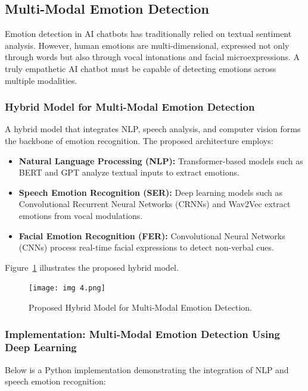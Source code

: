\documentclass[a4paper,10pt]{article}
\begin{document}
\subsection{Multi-Modal Emotion Detection}
Emotion detection in AI chatbots has traditionally relied on textual sentiment analysis. However, human emotions are multi-dimensional, expressed not only through words but also through vocal intonations and facial microexpressions. A truly empathetic AI chatbot must be capable of detecting emotions across multiple modalities.

\subsubsection{Hybrid Model for Multi-Modal Emotion Detection}
A hybrid model that integrates NLP, speech analysis, and computer vision forms the backbone of emotion recognition. The proposed architecture employs:

\begin{itemize}
    \item \textbf{Natural Language Processing (NLP):} Transformer-based models such as BERT and GPT analyze textual inputs to extract emotions.
    \item \textbf{Speech Emotion Recognition (SER):} Deep learning models such as Convolutional Recurrent Neural Networks (CRNNs) and Wav2Vec extract emotions from vocal modulations.
    \item \textbf{Facial Emotion Recognition (FER):} Convolutional Neural Networks (CNNs) process real-time facial expressions to detect non-verbal cues.
\end{itemize}

Figure~\ref{fig:multi_modal_architecture} illustrates the proposed hybrid model.

\begin{figure}[h]
    \centering
    \texttt{[image: img 4.png]}
    \caption{Proposed Hybrid Model for Multi-Modal Emotion Detection.}
    \label{fig:multi_modal_architecture}
\end{figure}

\subsubsection{Implementation: Multi-Modal Emotion Detection Using Deep Learning}

Below is a Python implementation demonstrating the integration of NLP and speech emotion recognition:
\end{document}

